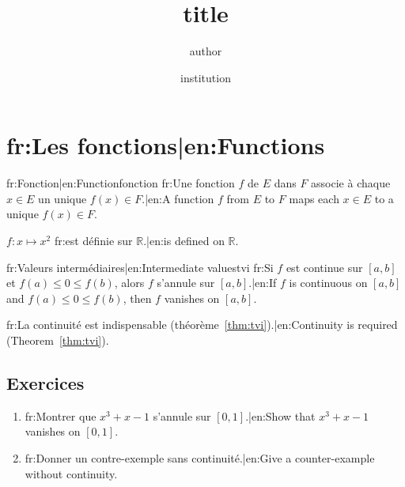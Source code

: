 \documentclass[11pt,a4paper]{article}
\title{{{title}}}
\author{{{author}}}
\date{{{institution}}}
\begin{document}
\maketitle
\tableofcontents

\section{{{fr:Les fonctions|en:Functions}}}

\begin{definition}{{{fr:Fonction|en:Function}}}{fonction}
  {{fr:Une fonction $f$ de $E$ dans $F$ associe à chaque $x \in E$ un unique $f(x) \in F$.|en:A function $f$ from $E$ to $F$ maps each $x \in E$ to a unique $f(x) \in F$.}}
\end{definition}

\begin{exemple}
  $f \colon x \mapsto x^2$ {{fr:est définie sur $\mathbb{R}$.|en:is defined on $\mathbb{R}$.}}
\end{exemple}

\begin{theoreme}{{{fr:Valeurs intermédiaires|en:Intermediate values}}}{tvi}
  {{fr:Si $f$ est continue sur $[a,b]$ et $f(a) \leq 0 \leq f(b)$, alors $f$ s'annule sur $[a,b]$.|en:If $f$ is continuous on $[a,b]$ and $f(a) \leq 0 \leq f(b)$, then $f$ vanishes on $[a,b]$.}}
\end{theoreme}

\begin{attention}
  {{fr:La continuité est indispensable (théorème~\ref{thm:tvi}).|en:Continuity is required (Theorem~\ref{thm:tvi}).}}
\end{attention}

\subsection*{Exercices}
\begin{enumerate}[label=\textbf{\arabic*.}]
  \item {{fr:Montrer que $x^3 + x - 1$ s'annule sur $[0,1]$.|en:Show that $x^3 + x - 1$ vanishes on $[0,1]$.}}
  \item {{fr:Donner un contre-exemple sans continuité.|en:Give a counter-example without continuity.}}
\end{enumerate}
\end{document}

